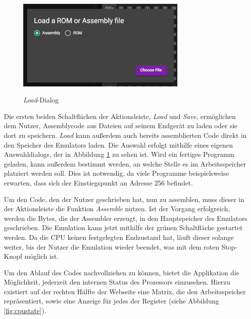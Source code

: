 \begin{figure}
    \caption{\textit{Load}-Dialog}
    \centering
    \includegraphics[width=0.75\textwidth]{Bilder/LoadDialog.png}
    \label{fig:loaddialog}
\end{figure}

Die ersten beiden Schaltflächen der Aktionsleiste, \textit{Load} und \textit{Save}, ermöglichen dem Nutzer, Assemblycode aus Dateien auf seinem Endgerät zu laden oder sie dort zu speichern. \textit{Load} kann außerdem auch bereits assemblierten Code direkt in den Speicher des Emulators laden. Die Auswahl erfolgt mithilfe eines eigenen Auswahldialogs, der in Abbildung \ref{fig:loaddialog} zu sehen ist. Wird ein fertiges Programm geladen, kann außerdem bestimmt werden, an welche Stelle es im Arbeitsspeicher platziert werden soll. Dies ist notwendig, da viele Programme beispielsweise erwarten, dass sich der Einstiegspunkt an Adresse 256 befindet.

Um den Code, den der Nutzer geschrieben hat, nun zu assemblen, muss dieser in der Aktionsleiste die Funktion \textit{Assemble} nutzen. Ist der Vorgang erfolgreich, werden die Bytes, die der Assembler erzeugt, in den Hauptspeicher des Emulators geschrieben. Die Emulation kann jetzt mithilfe der grünen Schaltfläche gestartet werden. Da die CPU keinen festgelegten Endzustand hat, läuft dieser solange weiter, bis der Nutzer die Emulation wieder beendet, was mit dem roten Stop-Knopf möglich ist.

Um den Ablauf des Codes nachvollziehen zu können, bietet die Applikation die Möglichkeit, jederzeit den internen Status des Prozessors einzusehen. Hierzu existiert auf der rechten Hälfte der Webseite eine Matrix, die den Arbeitsspeicher repräsentiert, sowie eine Anzeige für jedes der Register (siehe Abbildung \ref{fig:cpustate}).


